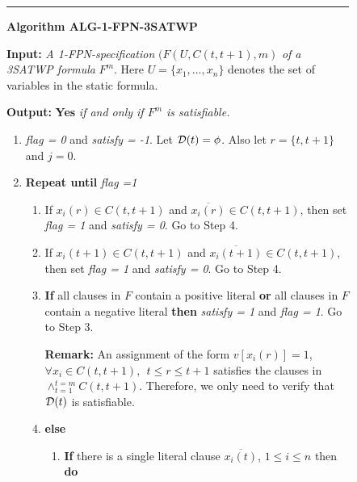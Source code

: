 {\footnotesize
\begin{figure}[tbp]
\rule{\textwidth}{0.01in}

\noindent
{\bf Algorithm ALG-1-FPN-3SATWP} 

\noindent
{\bf Input:} {\it A 1-FPN-specification} $(F(U, C(t,t+1),m)$
{\it of a 3SATWP formula } $F^m$.  Here $U = \{ x_1, \ldots, x_n \}$
denotes the set of variables in the static formula.

\noindent
{\bf Output:} {\bf Yes} {\it if and only if $F^m$  is satisfiable.} 

\begin{enumerate}

\item
{\em flag = 0} and {\em satisfy = -1}. Let ${\cal D}(t) = \phi$. Also let 
$ r = \{ t, t+1 \}$ and $j =0$.

\item
{\bf Repeat until} {\em flag =1 }

\begin{enumerate}

\item
If $x_i(r) \in C(t, t+1)$  and $\overline{x_i(r)} \in C(t, t+1)$, 
then set {\em flag = 1} and {\em satisfy = 0}. Go to Step 4.


\item
If $x_i(t+1) \in C(t, t+1)$  and $\overline{x_i(t+1)} \in C(t, t+1)$, 
then set {\em flag = 1} and {\em satisfy = 0}. Go to Step 4.



\item
{\bf If} all clauses in $F$ contain a positive literal {\bf or}
all clauses in $F$ contain a negative literal {\bf then} {\em satisfy = 1}
and {\em flag = 1}. Go to Step 3.


\noindent
{\bf Remark:} 
An assignment of the form 
$v[x_i(r)] = 1$, $\forall x_i \in C(t, t+1), ~~ t \leq r \leq t+1$
satisfies the clauses in $\wedge_{t =1}^{t = m} C(t, t+1)$.  Therefore,
we only need to verify that ${\cal D}(t)$ is satisfiable. 


\item 
{\bf else}

\begin{enumerate}

\item
{\bf If} there is a single literal clause $\overline{x_i(t)}$, 
$1 \leq i \leq n$ then {\bf do}

\begin{enumerate}


\end{enumerate}
\end{enumerate}
\end{enumerate}
\end{enumerate}
\end{figure}}
